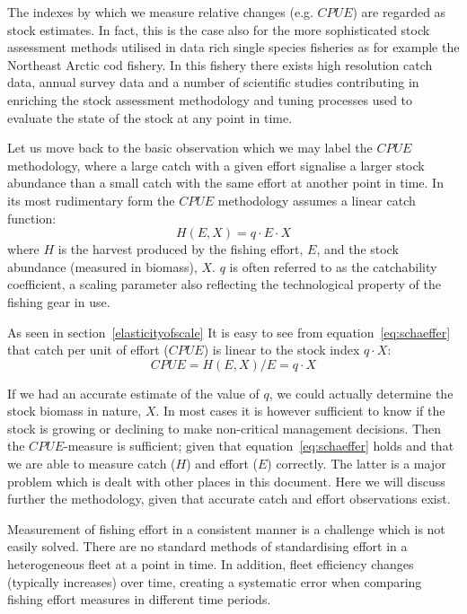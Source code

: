 \documentclass[11pt,fleqn]{book} %
\begin{document}
The indexes by which we measure relative changes (e.g. $CPUE$) are regarded as stock estimates. In fact, this is the case also for the more sophisticated stock assessment methods utilised in data rich single species fisheries as for example the Northeast Arctic cod fishery. In this fishery there exists high resolution catch data, annual survey data and a number of scientific studies contributing in enriching the stock assessment methodology and tuning processes used to evaluate the state of the stock at any point in time.

Let us move back to the basic observation which we may label the $CPUE$ methodology, where a large catch with a given effort signalise a larger stock abundance than a small catch with the same effort at another point in time. In its most rudimentary form the $CPUE$ methodology assumes a linear catch function:
\begin{equation} 
\label{eq:schaeffer}
H(E,X) = q \cdot E \cdot X
\end{equation}
where $H$ is the harvest produced by the fishing effort, $E$, and the stock abundance (measured in biomass), $X$. $q$ is often referred to as the catchability coefficient, a scaling parameter also reflecting the technological property of the fishing gear in use.

As seen in section~\ref{elasticityofscale} It is easy to see from equation~\ref{eq:schaeffer} that catch per unit of effort ($CPUE$) is linear to the stock index $q \cdot X$:
\begin{equation} 
\label{eq:cpue}
CPUE = H(E,X)/E = q \cdot X
\end{equation}

If we had an accurate estimate of the value of $q$, we could actually determine the stock biomass in nature, $X$. In most cases it is however sufficient to know if the stock is growing or declining to make non-critical management decisions. Then the $CPUE$-measure is sufficient; given that equation~\ref{eq:schaeffer} holds and that we are able to measure catch ($H$) and effort ($E$) correctly. The latter is a major problem which is dealt with other places in this document. Here we will discuss further the methodology, given that accurate catch and effort observations exist.

Measurement of fishing effort in a consistent manner is a challenge which is not easily solved. There are no standard methods of standardising effort in a heterogeneous fleet at a point in time. In addition, fleet efficiency changes (typically increases) over time, creating a systematic error when comparing fishing effort measures in different time periods.
\end{document}
